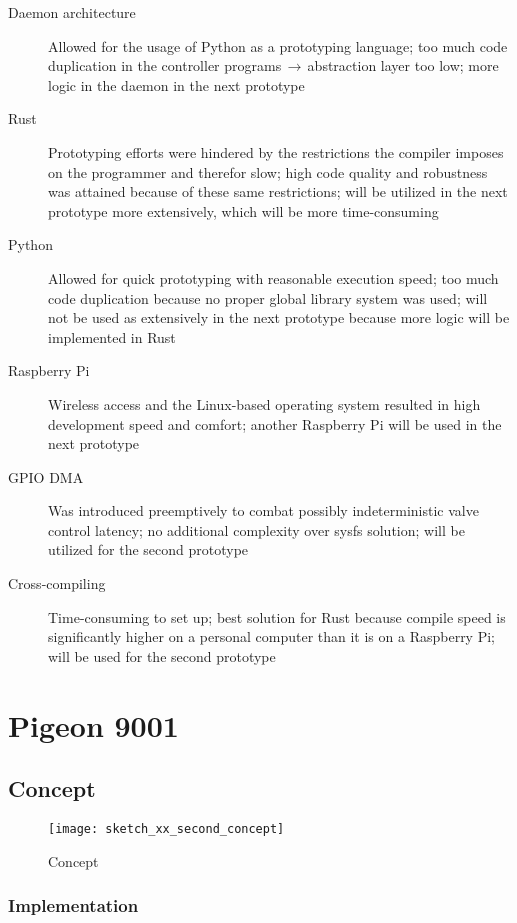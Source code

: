 \begin{description}
\item [Daemon architecture] Allowed for the usage of Python as a prototyping language; too much code duplication in the controller programs$\,\to\,$abstraction layer too low; more logic in the daemon in the next prototype
\item [Rust] Prototyping efforts were hindered by the restrictions the compiler imposes on the programmer and therefor slow; high code quality and robustness was attained because of these same restrictions; will be utilized in the next prototype more extensively, which will be more time-consuming
\item [Python] Allowed for quick prototyping with reasonable execution speed; too much code duplication because no proper global library system was used; will not be used as extensively in the next prototype because more logic will be implemented in Rust
\item [Raspberry Pi] Wireless access and the Linux-based operating system resulted in high development speed and comfort; another Raspberry Pi will be used in the next prototype
\item [GPIO DMA] Was introduced preemptively to combat possibly indeterministic valve control latency; no additional complexity over sysfs solution; will be utilized for the second prototype 
\item [Cross-compiling] Time-consuming to set up; best solution for Rust because compile speed is significantly higher on a personal computer than it is on a Raspberry Pi; will be used for the second prototype 
\end{description}





\chapter{Pigeon 9001}

\section{Concept}



\begin{figure}[h]
\centering

\texttt{[image: sketch\_xx\_second\_concept]}

\caption{Concept}
\end{figure}

\subsection{Implementation}

